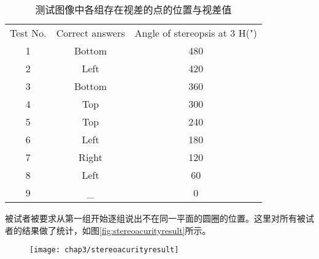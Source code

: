 \begin{table}[]
\centering
\caption{测试图像中各组存在视差的点的位置与视差值}
\label{tab:correctanswer}
\begin{tabular}{|c|c|c|}
\hline
\multirow{2}{*}{Test No.} & \multirow{2}{*}{Correct answers} & \multirow{2}{*}{Angle of stereopsis at 3 H(")} \\
                          &                                  &                                                \\ \hline
1                         & Bottom                           & 480                                            \\ \hline
2                         & Left                             & 420                                            \\ \hline
3                         & Bottom                           & 360                                            \\ \hline
4                         & Top                              & 300                                            \\ \hline
5                         & Top                              & 240                                            \\ \hline
6                         & Left                             & 180                                            \\ \hline
7                         & Right                            & 120                                            \\ \hline
8                         & Left                             & 60                                             \\ \hline
9                         & \_                               & 0                                              \\ \hline
\end{tabular}
\end{table}
被试者被要求从第一组开始逐组说出不在同一平面的圆圈的位置。这里对所有被试者的结果做了统计，如图\ref{fig:stereoacurityresult}所示。
\begin{figure}[ht]
  \centering
  \texttt{[image: chap3/stereoacurityresult]}
\end{figure}
